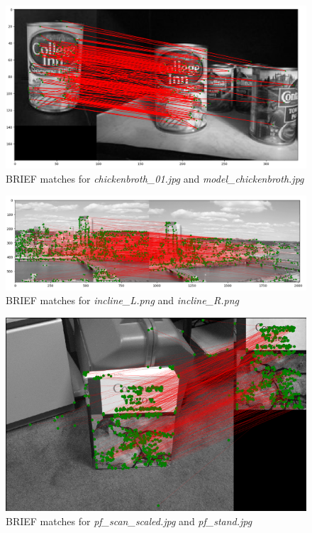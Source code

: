 \documentclass[a4paper]{article}
\begin{document}
\begin{figure}[!ht]
    \centering
    \includegraphics[width=\textwidth]{images/BRIEF_matches}
    \caption{BRIEF matches for \textit{chickenbroth\_01.jpg} and \textit{model\_chickenbroth.jpg}}
\end{figure}

\begin{figure}[!ht]
    \centering
    \includegraphics[width=\textwidth]{images/incline_BRIEF}
    \caption{BRIEF matches for \textit{incline\_L.png} and \textit{incline\_R.png}}
\end{figure}

\begin{figure}[!htb]
    \centering
    \includegraphics[width=\textwidth]{images/pf_scan_stand}
    \caption{BRIEF matches for \textit{pf\_scan\_scaled.jpg} and \textit{pf\_stand.jpg}}
\end{figure}
\end{document}
